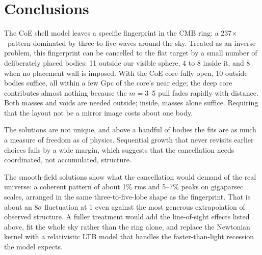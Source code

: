 \documentclass[aps,prd,twocolumn,nofootinbib,superscriptaddress,floatfix]{revtex4-2}
\newcommand{\fl}{\ensuremath{\times}}
\begin{document}
\section{Conclusions}
The CoE shell model leaves a specific fingerprint in the CMB ring: a 237\fl\ pattern dominated by three to five waves around the sky. Treated as an inverse problem, this fingerprint can be cancelled to the flat target by a small number of deliberately placed bodies: 11 outside our visible sphere, 4 to 8 inside it, and 8 when no placement wall is imposed. With the CoE core fully open, 10 outside bodies suffice, all within a few Gpc of the core's near edge; the deep core contributes almost nothing because the $m=3$--5 pull fades rapidly with distance. Both masses and voids are needed outside; inside, masses alone suffice. Requiring that the layout not be a mirror image costs about one body.

The solutions are not unique, and above a handful of bodies the fits are as much a measure of freedom as of physics. Sequential growth that never revisits earlier choices fails by a wide margin, which suggests that the cancellation needs coordinated, not accumulated, structure.

The smooth-field solutions show what the cancellation would demand of the real universe: a coherent pattern of about 1\% rms and 5--7\% peaks on gigaparsec scales, arranged in the same three-to-five-lobe shape as the fingerprint. That is about an $8\sigma$ fluctuation at \SI{1}{\Gpc} even against the most generous extrapolation of observed structure. A fuller treatment would add the line-of-sight effects listed above, fit the whole sky rather than the ring alone, and replace the Newtonian kernel with a relativistic LTB model that handles the faster-than-light recession the model expects.



\end{document}
